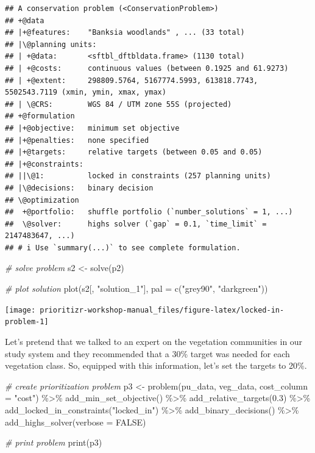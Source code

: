 \documentclass[
  12pt,
]{book}
\newenvironment{Shaded}{\begin{snugshade}}{\end{snugshade}}
\newcommand{\AttributeTok}[1]{\textcolor[rgb]{0.77,0.63,0.00}{#1}}
\newcommand{\CommentTok}[1]{\textcolor[rgb]{0.56,0.35,0.01}{\textit{#1}}}
\newcommand{\ConstantTok}[1]{\textcolor[rgb]{0.00,0.00,0.00}{#1}}
\newcommand{\FloatTok}[1]{\textcolor[rgb]{0.00,0.00,0.81}{#1}}
\newcommand{\FunctionTok}[1]{\textcolor[rgb]{0.00,0.00,0.00}{#1}}
\newcommand{\NormalTok}[1]{#1}
\newcommand{\OtherTok}[1]{\textcolor[rgb]{0.56,0.35,0.01}{#1}}
\newcommand{\SpecialCharTok}[1]{\textcolor[rgb]{0.00,0.00,0.00}{#1}}
\newcommand{\StringTok}[1]{\textcolor[rgb]{0.31,0.60,0.02}{#1}}
\begin{document}
\begin{verbatim}
## A conservation problem (<ConservationProblem>)
## +@data
## |+@features:    "Banksia woodlands" , ... (33 total)
## |\@planning units:
## | +@data:       <sftbl_dftbldata.frame> (1130 total)
## | +@costs:      continuous values (between 0.1925 and 61.9273)
## | +@extent:     298809.5764, 5167774.5993, 613818.7743, 5502543.7119 (xmin, ymin, xmax, ymax)
## | \@CRS:        WGS 84 / UTM zone 55S (projected)
## +@formulation
## |+@objective:   minimum set objective
## |+@penalties:   none specified
## |+@targets:     relative targets (between 0.05 and 0.05)
## |+@constraints:
## ||\@1:          locked in constraints (257 planning units)
## |\@decisions:   binary decision
## \@optimization
##  +@portfolio:   shuffle portfolio (`number_solutions` = 1, ...)
##  \@solver:      highs solver (`gap` = 0.1, `time_limit` = 2147483647, ...)
## # i Use `summary(...)` to see complete formulation.
\end{verbatim}

\begin{Shaded}
\begin{Highlighting}[]
\CommentTok{\# solve problem}
\NormalTok{s2 }\OtherTok{\textless{}{-}} \FunctionTok{solve}\NormalTok{(p2)}

\CommentTok{\# plot solution}
\FunctionTok{plot}\NormalTok{(s2[, }\StringTok{"solution\_1"}\NormalTok{], }\AttributeTok{pal =} \FunctionTok{c}\NormalTok{(}\StringTok{"grey90"}\NormalTok{, }\StringTok{"darkgreen"}\NormalTok{))}
\end{Highlighting}
\end{Shaded}

\begin{center}\texttt{[image: prioritizr-workshop-manual\_files/figure-latex/locked-in-problem-1]} \end{center}

Let's pretend that we talked to an expert on the vegetation communities in our study system and they recommended that a 30\% target was needed for each vegetation class. So, equipped with this information, let's set the targets to 20\%.

\begin{Shaded}
\begin{Highlighting}[]
\CommentTok{\# create prioritization problem}
\NormalTok{p3 }\OtherTok{\textless{}{-}}
  \FunctionTok{problem}\NormalTok{(pu\_data, veg\_data, }\AttributeTok{cost\_column =} \StringTok{"cost"}\NormalTok{) }\SpecialCharTok{\%\textgreater{}\%}
  \FunctionTok{add\_min\_set\_objective}\NormalTok{() }\SpecialCharTok{\%\textgreater{}\%}
  \FunctionTok{add\_relative\_targets}\NormalTok{(}\FloatTok{0.3}\NormalTok{) }\SpecialCharTok{\%\textgreater{}\%}
  \FunctionTok{add\_locked\_in\_constraints}\NormalTok{(}\StringTok{"locked\_in"}\NormalTok{) }\SpecialCharTok{\%\textgreater{}\%}
  \FunctionTok{add\_binary\_decisions}\NormalTok{() }\SpecialCharTok{\%\textgreater{}\%}
  \FunctionTok{add\_highs\_solver}\NormalTok{(}\AttributeTok{verbose =} \ConstantTok{FALSE}\NormalTok{)}

\CommentTok{\# print problem}
\FunctionTok{print}\NormalTok{(p3)}
\end{Highlighting}
\end{Shaded}
\end{document}
